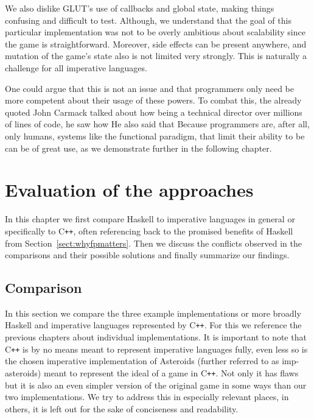 \documentclass[
  digital, %
  color,   %
  table,   %
  oneside, %
  lof,     %
  lot,     %
]{fithesis3}
\newcommand{\cpp}{C\nolinebreak\texttt{+}\nolinebreak\texttt{+}}
\begin{document}
{We also dislike GLUT's use of callbacks and global state, making things
confusing and difficult to test. Although, we understand that
the goal of this particular implementation was not to be overly ambitious
about scalability since the game is straightforward.
Moreover, side effects can be present anywhere, and mutation of the game's state
also is not limited very strongly. This is naturally a challenge for all imperative languages.

One could argue that this is not an issue and that programmers only need be
more competent about their usage of these powers. To combat this, the already quoted
John Carmack talked about how being a technical director over millions of lines of code,
he saw how \cite{carmackkeynote} He also said that
\cite{carmackkeynote}
Because programmers are, after all, only humans, systems like the functional paradigm,
that limit their ability to be  can be of great use, as we demonstrate
further in the following chapter.




\chapter{Evaluation of the approaches}
\label{chptr:evaluation}

In this chapter we first compare Haskell to imperative languages in general or specifically to \cpp{},
often referencing back to the promised benefits of Haskell from Section~\ref{sect:whyfpmatters}.
Then we discuss the conflicts observed in the comparisons and their possible solutions
and finally summarize our findings.


\section{Comparison}

In this section we compare the three example implementations or more broadly Haskell and
imperative languages represented by \cpp{}.
For this we reference the previous chapters about individual implementations.
It is important to note that \cpp{} is by no means meant
to represent imperative languages fully, even less so is the chosen imperative implementation
of Asteroids (further referred to as imp-asteroids) meant to represent
the ideal of a game in \cpp{}. Not only it has flaws but it is also an even
simpler version of the original game in some ways than our two implementations.
We try to address this in especially relevant places,
in others, it is left out for the sake of conciseness and readability.

}
\end{document}

